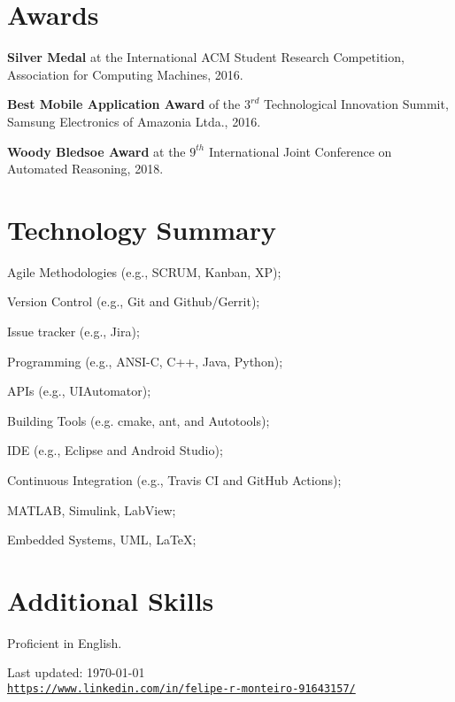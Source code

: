 \documentclass[letterpaper]{article}
\def\footerlink{https://www.linkedin.com/in/felipe-r-monteiro-91643157/}
\renewenvironment{itemize}{
  \begin{list}{}{
    \setlength{\leftmargin}{1.5em}
  }
}{
  \end{list}
}
\begin{document}
\section*{Awards}
\begin{itemize}
  \item {\bf Silver Medal} at the International ACM Student Research Competition, Association for Computing Machines, 2016.

  \item {\bf Best Mobile Application Award} of the $3^{rd}$ Technological Innovation Summit, Samsung Electronics of Amazonia Ltda., 2016.
  
  \item {\bf Woody Bledsoe Award} at the $9^{th}$ International Joint Conference on Automated Reasoning, 2018.
\end{itemize}


\section*{Technology Summary}
   \begin{itemize}
   \item{Agile Methodologies (e.g., SCRUM, Kanban, XP);}
   \item{Version Control (e.g., Git and Github/Gerrit);}
   \item{Issue tracker (e.g., Jira);}
   \item{Programming (e.g., ANSI-C, C++, Java, Python);}
   \item{APIs (e.g., UIAutomator);}
   \item{Building Tools (e.g. cmake, ant, and Autotools);}
   \item{IDE (e.g., Eclipse and Android Studio);}
   \item{Continuous Integration (e.g., Travis CI and GitHub Actions);}
   \item{MATLAB, Simulink, LabView;}
   \item{Embedded Systems, UML, \LaTeX;}
   \end{itemize}
   
\section*{Additional Skills}
\begin{itemize}
  \item Proficient in English.
\end{itemize}

\bigskip

\begin{center}
  \begin{footnotesize}
    Last updated: \today \\
    \href{\footerlink}{\texttt{\footerlink}}
  \end{footnotesize}
\end{center}
\end{document}
